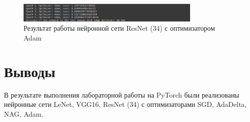 \documentclass[a4paper, 14pt]{extarticle}
\begin{document}
\begin{figure}[!htb]
	\centering
	\includegraphics[width=0.8\textwidth]{img19}
\caption{Результат работы нейронной сети ResNet (34) с оптимизатором Adam}
\label{fig:img19}
\end{figure}

\section{Выводы}\label{Sect::conclusion}

В результате выполнения лабораторной работы на PyTorch были реализованы нейронные сети LeNet, VGG16, ResNet (34) с оптимизаторами SGD, AdaDelta, NAG, Adam.
\end{document}
